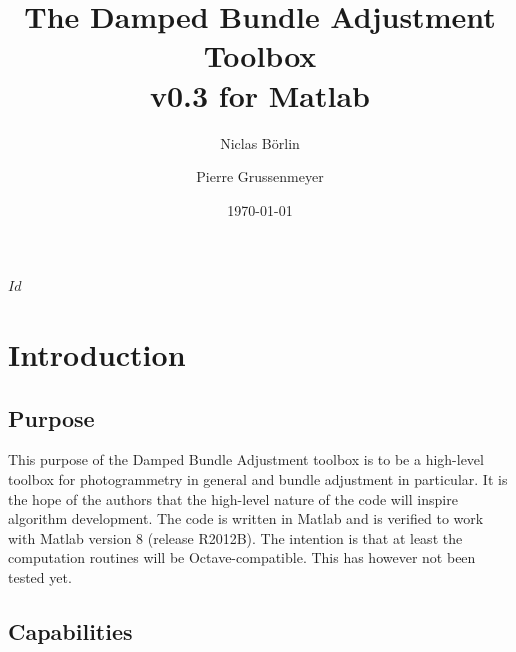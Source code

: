 \documentclass{article}
\begin{document}


\svnInfo $Id$

\newcommand{\dbatversion}{0.3}

\title{The Damped Bundle Adjustment Toolbox\\v\dbatversion{} for Matlab}

\author[1]{Niclas B{\"o}rlin}
\author[2]{Pierre Grussenmeyer}
\date{\today}

\maketitle

\newpage

\tableofcontents

\newpage

\section{Introduction}

\subsection{Purpose}

This purpose of the Damped Bundle Adjustment toolbox is to be a
high-level toolbox for photogrammetry in general and bundle adjustment
in particular. It is the hope of the authors that the high-level
nature of the code will inspire algorithm development. The code is
written in Matlab and is verified to work with Matlab version 8
(release R2012B). The intention is that at least the computation
routines will be Octave-compatible. This has however not been tested
yet.

\subsection{Capabilities}
\end{document}
